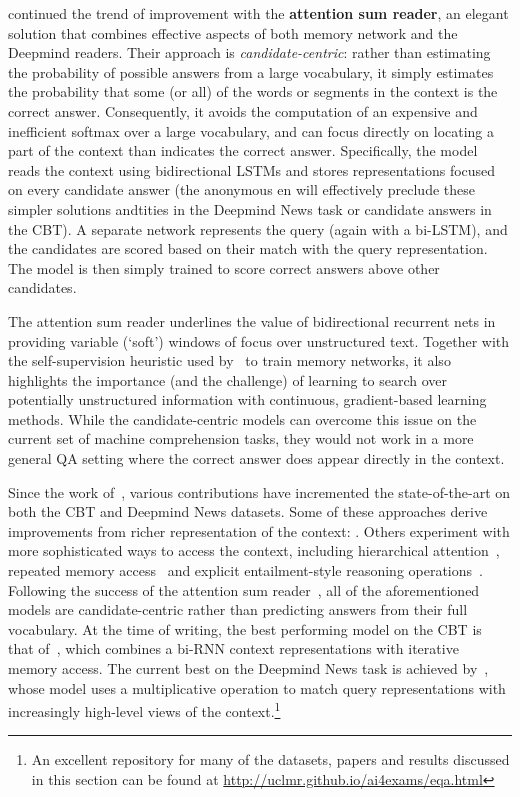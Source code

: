 \documentclass[11pt,letterpaper]{article}
\begin{document}
 continued the trend of improvement with the {\bf attention sum reader}, an elegant solution that combines effective aspects of both memory network and the Deepmind readers. Their approach is \emph{candidate-centric}: rather than estimating the probability of possible answers from a large vocabulary, it simply estimates the probability that some (or all) of the words or segments in the context is the correct answer. Consequently, it avoids the computation of an expensive and inefficient softmax over a large vocabulary, and can focus directly on locating a part of the context than indicates the correct answer. Specifically, the model reads the context using bidirectional LSTMs and stores representations focused on every candidate answer (the anonymous en will effectively preclude these simpler solutions andtities in the Deepmind News task or candidate answers in the CBT). A separate network represents the query (again with a bi-LSTM), and the candidates are scored based on their match with the query representation. The model is then simply trained to score correct answers above other candidates.  

The attention sum reader underlines the value of bidirectional recurrent nets in providing variable (`soft') windows of focus over unstructured text. Together with the self-supervision heuristic used by~ to train memory networks, it also highlights the importance (and the challenge) of learning to search over potentially unstructured information with continuous, gradient-based learning methods. While the candidate-centric models can overcome this issue on the current set of machine comprehension tasks, they would not work in a more general QA setting where the correct answer does appear directly in the context. 

Since the work of~, various contributions have incremented the state-of-the-art on both the CBT and Deepmind News datasets. Some of these approaches derive improvements from richer representation of the context:  \cite{kobayashi2016dynamic,weissenborn2016separating,sordoni2016iterative}. Others experiment with more sophisticated ways to access the context, including hierarchical attention~\cite{cui2016attention}, repeated memory access~\cite{cui2016attention,weissenborn2016separating,dhingra2016gated,sordoni2016iterative} and explicit entailment-style reasoning operations~\cite{trischler2016natural}. Following the success of the attention sum reader~,  all of the aforementioned models are candidate-centric rather than predicting answers from their full vocabulary. At the time of writing, the best performing model on the CBT is that of~\cite{sordoni2016iterative}, which combines a bi-RNN context representations with iterative memory access. The current best on the Deepmind News task is achieved by~, whose model uses a multiplicative operation to match query representations with increasingly high-level views of the context.\footnote{An excellent repository for many of the datasets, papers and results discussed in this section can be found at \url{http://uclmr.github.io/ai4exams/eqa.html}}
\end{document}
